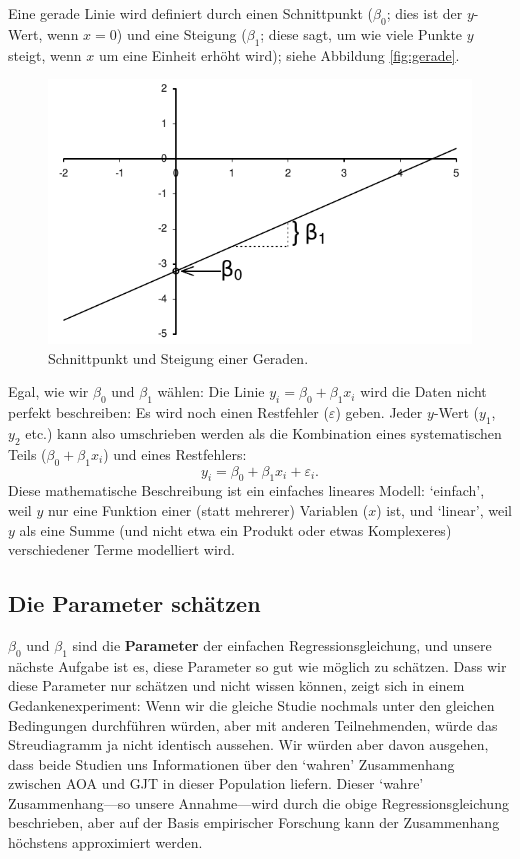 \documentclass[oneside, 10pt]{book}\usepackage[]{graphicx}\usepackage[]{xcolor}
\newenvironment{knitrout}{}{} %
\begin{document}
Eine gerade Linie wird definiert durch
einen Schnittpunkt ($\beta_0$; dies ist der $y$-Wert, wenn $x = 0$)
und eine Steigung ($\beta_1$; diese sagt, um
wie viele Punkte $y$ steigt, wenn $x$ um eine Einheit erhöht wird);
siehe Abbildung \ref{fig:gerade}.

\begin{knitrout}
\color{fgcolor}\begin{figure}[tp]

{\centering \includegraphics[width=.6\textwidth]{figs/unnamed-chunk-196-1} 

}

\caption{Schnittpunkt und Steigung einer Geraden.\label{fig:gerade}}\label{fig:unnamed-chunk-196}
\end{figure}

\end{knitrout}

Egal, wie wir $\beta_0$ und $\beta_1$ wählen: Die Linie $y_i = \beta_0 + \beta_1 x_i$ wird die
Daten nicht perfekt beschreiben: Es wird noch einen Restfehler ($\varepsilon$) geben.
Jeder $y$-Wert ($y_1$, $y_2$ etc.) kann also umschrieben werden
als die Kombination eines systematischen Teils ($\beta_0+\beta_1 x_i$)
und eines Restfehlers:
\begin{equation}\label{eq:simpleregression}
y_i = \beta_0 + \beta_1 x_i + \varepsilon_i.
\end{equation}
Diese mathematische Beschreibung ist ein einfaches lineares Modell:
`einfach', weil $y$ nur eine Funktion einer (statt mehrerer) Variablen ($x$) ist,
und `linear', weil $y$ als eine Summe (und nicht etwa ein
Produkt oder etwas Komplexeres) verschiedener Terme modelliert wird.

\subsection{Die Parameter schätzen}
$\beta_0$ und $\beta_1$ sind die \textbf{Parameter} der einfachen Regressionsgleichung,
und unsere nächste Aufgabe ist es, diese Parameter so gut wie möglich zu schätzen.
Dass wir diese Parameter nur schätzen und nicht wissen können, zeigt sich
in einem Gedankenexperiment: Wenn wir die gleiche Studie nochmals
unter den gleichen Bedingungen durchführen
würden, aber mit anderen Teilnehmenden, würde das Streudiagramm ja nicht identisch
aussehen. Wir würden aber davon ausgehen, dass beide Studien uns Informationen
über den `wahren' Zusammenhang zwischen AOA und GJT in dieser Population liefern.
Dieser `wahre' Zusammenhang---so unsere Annahme---wird durch die obige Regressionsgleichung
beschrieben, aber auf der Basis empirischer Forschung kann der
Zusammenhang höchstens approximiert werden.
\end{document}
